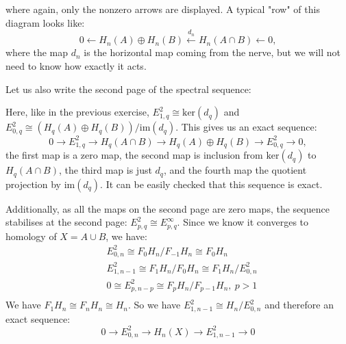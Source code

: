 \documentclass{article}
\begin{document}
\noindent
where again, only the nonzero arrows are displayed.
A typical "{}row"{} of this diagram looks like:
\begin{equation*}
0 \leftarrow H_n(A) \oplus H_n(B) \xleftarrow{d_n} H_n(A \cap B) \leftarrow 0,
\end{equation*}
where the map $d_n$ is the horizontal map coming from the nerve, but we will not need to know how exactly it acts.

\noindent
Let us also write the second page of the spectral sequence:

\begin{center}\end{center}

Here, like in the previous exercise, $E^2_{1,q} \cong \mathrm{ker}(d_q)$ and $E^2_{0,q} \cong (H_q(A) \oplus H_q(B)) / \mathrm{im}(d_q)$.
This gives us an exact sequence:
\begin{equation*}
0 \to E^2_{1,q} \to H_q(A \cap B) \to H_q(A) \oplus H_q(B) \to E^2_{0,q} \to 0,
\end{equation*}
the first map is a zero map, the second map is inclusion from $\mathrm{ker}(d_q)$ to $H_q(A \cap B)$, the third map is just $d_q$, and the fourth map the quotient projection by $\mathrm{im}(d_q)$. It can be easily checked that this sequence is exact.

Additionally, as all the maps on the second page are zero maps, the sequence stabilises at the second page: $E^2_{p,q} \cong E^\infty_{p,q}$. Since we know it converges to homology of $X=A\cup B$, we have: 
\begin{align*}
& E^2_{0,n} \cong F_0 H_n/F_{-1} H_n \cong F_0 H_n \\ 
& E^2_{1,n-1} \cong F_1 H_n / F_0 H_n \cong F_1 H_n / E^2_{0,n} \\
& 0 \cong E^2_{p,n-p} \cong F_p H_n/F_{p-1} H_n, \  p>1\\
\end{align*}
We have $F_1 H_n \cong F_n H_n \cong H_n$. So we have $E^2_{1,n-1} \cong H_n / E^2_{0,n}$ and therefore an exact sequence:
\begin{equation*}
0 \to E_{0,n}^2 \to H_n(X) \to E_{1,n-1}^2 \to 0
\end{equation*}
\end{document}
